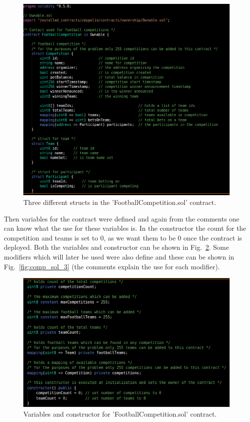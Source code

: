 \begin{figure}[H]
\centering
  \includegraphics[scale = .70]{imgs/comp_sol_1.png}
  \caption{Three different structs in the 'FootballCompetition.sol' contract.}
  \label{fig:comp_sol_1}
\end{figure}

\noindent
Then variables for the contract were defined and again from the comments one can know what the use for these variables is. In the constructor the count for the competition and teams is set to 0, as we want them to be 0 once the contract is deployed. Both the variables and constructor can be shown in Fig.~\ref{fig:comp_sol_2}. Some modifiers which will later be used were also define and these can be shown in Fig.~\ref{fig:comp_sol_3} (the comments explain the use for each modifier).

\begin{figure}[H]
\centering
  \includegraphics[scale = .70]{imgs/comp_sol_2.png}
  \caption{Variables and constructor for 'FootballCompetition.sol' contract.}
  \label{fig:comp_sol_2}
\end{figure}

